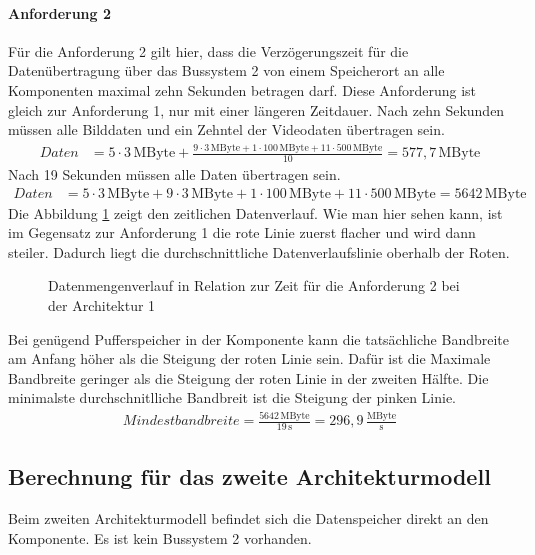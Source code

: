 \paragraph{Anforderung 2}
Für die Anforderung 2 gilt hier, dass die Verzögerungszeit für die Datenübertragung über das Bussystem 2 von einem Speicherort an alle Komponenten maximal zehn Sekunden betragen darf. Diese Anforderung ist gleich zur Anforderung 1, nur mit einer längeren Zeitdauer.
Nach zehn Sekunden müssen alle Bilddaten und ein Zehntel der Videodaten übertragen sein.
\begin{align}
	Daten &= 5 \cdot 3\,\mathrm{MByte} + \frac{9 \cdot 3 \,\mathrm{MByte} + 1 \cdot 100\,\mathrm{MByte} + 11 \cdot 500\,\mathrm{MByte}}{10} =  577,7\,\mathrm{MByte}
\end{align}
Nach 19 Sekunden müssen alle Daten übertragen sein.
\begin{align}
	Daten &= 5 \cdot 3\,\mathrm{MByte} + 9 \cdot 3 \,\mathrm{MByte} + 1 \cdot 100\,\mathrm{MByte} + 11 \cdot 500\,\mathrm{MByte} =  5642\,\mathrm{MByte}
\end{align}
Die Abbildung \ref{fig:arch1anf2} zeigt den zeitlichen Datenverlauf. Wie man hier sehen kann, ist im Gegensatz zur Anforderung 1 die rote Linie zuerst flacher und wird dann steiler. Dadurch liegt die durchschnittliche Datenverlaufslinie oberhalb der Roten.
\begin{figure}[]
	\centering
	
	\caption[Datenmengenverlauf in Relation zur Zeit für die Anforderung 2 bei der Architektur 1]{Datenmengenverlauf in Relation zur Zeit für die Anforderung 2 bei der Architektur 1}
	\label{fig:arch1anf2}
\end{figure}
Bei genügend Pufferspeicher in der Komponente kann die tatsächliche Bandbreite am Anfang höher als die Steigung der roten Linie sein. Dafür ist die Maximale Bandbreite geringer als die Steigung der roten Linie in der zweiten Hälfte. Die minimalste durchschnitlliche Bandbreit ist die Steigung der pinken Linie.
\begin{align}
	Mindestbandbreite = \frac{5642\,\mathrm{MByte}}{19\,\mathrm{s}} = 296,9\,\frac{\mathrm{MByte}}{\mathrm{s}}
\end{align}
\subsection{Berechnung für das zweite Architekturmodell}
Beim zweiten Architekturmodell befindet sich die Datenspeicher direkt an den Komponente. Es ist kein Bussystem 2 vorhanden.
